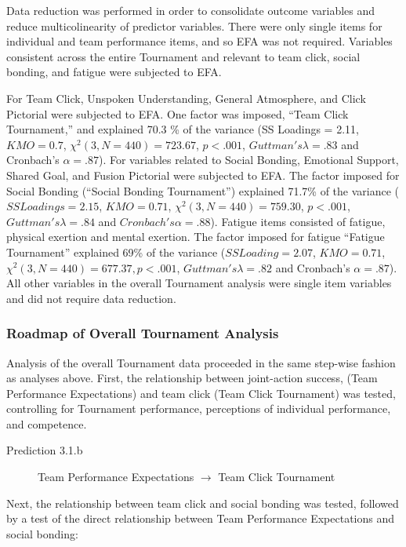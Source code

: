 \documentclass[12pt]{report}
\begin{document}
{Data reduction was performed in order to consolidate outcome variables and reduce multicolinearity of predictor variables. There were only single items for individual and team performance items, and so EFA was not required. Variables consistent across the entire Tournament and relevant to team click, social bonding, and fatigue were subjected to EFA.

For Team Click, Unspoken Understanding, General Atmosphere, and Click Pictorial were subjected to EFA. One factor was imposed, ``Team Click Tournament,'' and explained 70.3 \% of the variance (SS Loadings = 2.11, $KMO = 0.7$, $\chi^2(3, N = 440) =  723.67$, $p < .001$, $Guttman's \lambda =.83$ and Cronbach's $\alpha = .87$).  For variables related to Social Bonding, Emotional Support, Shared Goal, and Fusion Pictorial were subjected to EFA.  The factor imposed for Social Bonding (``Social Bonding Tournament'') explained 71.7\% of the variance ($SS Loadings =  2.15$, $KMO = 0.71$, $\chi^2(3, N = 440) =  759.30$, $p < .001$, $Guttman's \lambda =.84$ and $Cronbach's \alpha= .88$). Fatigue items consisted of fatigue, physical exertion and mental exertion.  The factor imposed for fatigue ``Fatigue Tournament'' explained 69\% of the variance ($SS Loading = 2.07$, $KMO = 0.71$, $\chi^2(3, N = 440) =  677.37, p < .001$, $Guttman's \lambda =.82$ and Cronbach's $\alpha = .87$).  All other variables in the overall Tournament analysis were single item variables and did not require data reduction.




\subsubsection{Roadmap of Overall Tournament Analysis}
Analysis of the overall Tournament data proceeded in the same step-wise fashion as analyses above. First, the relationship between joint-action success, (Team Performance Expectations) and team click (Team Click Tournament) was tested, controlling for Tournament performance, perceptions of individual performance, and competence.

\begin{description}
  \item [Prediction 3.1.b] Team Performance Expectations $\rightarrow$ Team Click Tournament
\end{description}

Next, the relationship between team click and social bonding was tested, followed by a test of the direct relationship between Team Performance Expectations and social bonding:

}
\end{document}
